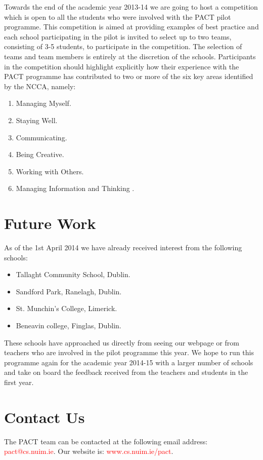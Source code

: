 \documentclass{article}
\begin{document}
Towards the end of the academic year 2013-14 we are going to host a competition which is open to all the students who were involved with the PACT pilot programme. This competition is aimed at providing examples of best practice and each school participating in the pilot is invited to select up to two teams, consisting of 3-5 students, to participate in the competition. The selection of teams and team members is entirely at the discretion of the schools. Participants in the competition should highlight explicitly how their experience with the PACT programme has contributed to two or more of the six key areas identified by the NCCA, namely:

\begin{enumerate}
  \item Managing Myself.
  \item Staying Well.
  \item Communicating.
  \item Being Creative.
  \item Working with Others.
  \item Managing Information and Thinking \cite{ncca2013}.
\end{enumerate}



\section{Future Work}
As of the 1st April 2014 we have already received interest from the following schools:
\begin{itemize}
  \item Tallaght Community School, Dublin. 
  \item Sandford Park, Ranelagh, Dublin.
  \item St. Munchin's College, Limerick.
  \item Beneavin college, Finglas, Dublin.
\end{itemize}

These schools have approached us directly from seeing our webpage or from teachers who are involved in the pilot programme this year. We hope to run this programme again for the academic year 2014-15 with a larger number of schools and take on board the feedback received from the teachers and students in the first year.

\section{Contact Us}
The PACT team can be contacted at the following email address: \textcolor{red}{pact@cs.nuim.ie}.
Our website is: \textcolor{red}{www.cs.nuim.ie/pact}.



\end{document}
